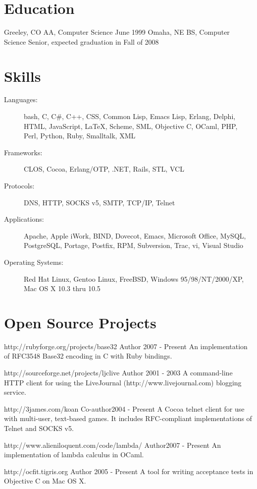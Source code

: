 \documentclass{resume}
\begin{document}
\section{Education}
\begin{itemize}
             {Greeley, CO}
             {AA, Computer Science}
             {June 1999}
             {Omaha, NE}
             {BS, Computer Science}
             {Senior, expected graduation in Fall of 2008}
\end{itemize}

\section{Skills}
\begin{description}
\item[Languages:] bash, C, C\#, C++, CSS, Common Lisp, Emacs Lisp, Erlang,
  Delphi, HTML, JavaScript, \LaTeX, Scheme, SML, Objective C, OCaml, PHP, Perl,
  Python, Ruby, Smalltalk, XML
\item[Frameworks:] CLOS, Cocoa, Erlang/OTP, .NET, Rails, STL, VCL
\item[Protocols:] DNS, HTTP, SOCKS v5, SMTP, TCP/IP, Telnet
\item[Applications:] Apache, Apple iWork, BIND, Dovecot, Emacs, Microsoft Office, MySQL,
  PostgreSQL, Portage, Postfix, RPM, Subversion, Trac, vi, Visual Studio
\item[Operating Systems:] Red Hat Linux, Gentoo Linux, FreeBSD, Windows
  95/98/NT/2000/XP, Mac OS X 10.3 thru 10.5
\end{description}

\section{Open Source Projects}
\begin{itemize}
             {http://rubyforge.org/projects/base32}
             {Author}
             {2007 - Present}
             An implementation of RFC3548 Base32 encoding in C with Ruby
             bindings.

             {http://sourceforge.net/projects/ljclive}
             {Author}
             {2001 - 2003}
             A command-line HTTP client for using the LiveJournal
             (http://www.livejournal.com) blogging service.

             {http://3james.com/koan}
             {Co-author}{2004 - Present}
             A Cocoa telnet client for use with multi-user, text-based
             games. It includes RFC-compliant implementations of Telnet and
             SOCKS v5.

             {http://www.alieniloquent.com/code/lambda/}
             {Author}{2007 - Present}
             An implementation of lambda calculus in OCaml.

             {http://ocfit.tigris.org}
             {Author}
             {2005 - Present}
             A tool for writing acceptance tests in Objective C on Mac OS X.
\end{itemize}
\end{document}
